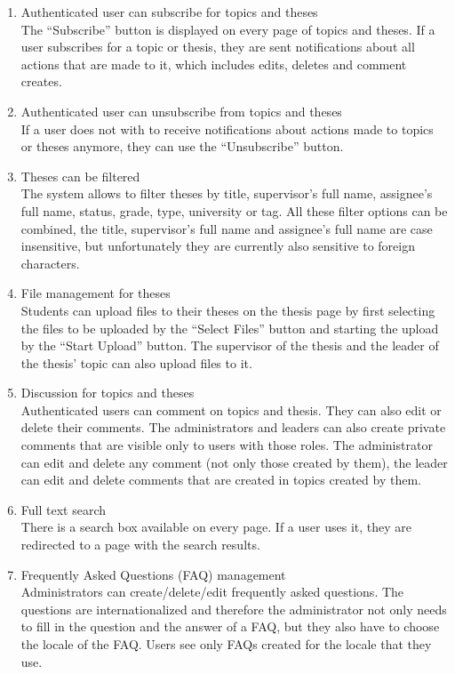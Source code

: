 \begin{enumerate}
    \item Authenticated user can subscribe for topics and theses\\
    The ``Subscribe'' button is displayed on every page of topics and theses. If a user subscribes for a topic or thesis, they are sent notifications about all actions that are made to it, which includes edits, deletes and comment creates.

    \item Authenticated user can unsubscribe from topics and theses\\
    If a user does not with to receive notifications about actions made to topics or theses anymore, they can use the ``Unsubscribe'' button.

    \item Theses can be filtered\\
    The system allows to filter theses by title, supervisor's full name, assignee's full name, status, grade, type, university or tag. All these filter options can be combined, the title, supervisor's full name and assignee's full name are case insensitive, but unfortunately they are currently also sensitive to foreign characters.

    \item File management for theses\\
    Students can upload files to their theses on the thesis page by first selecting the files to be uploaded by the ``Select Files'' button and starting the upload by the ``Start Upload'' button. The supervisor of the thesis and the leader of the thesis' topic can also upload files to it.

    \item Discussion for topics and theses\\
    Authenticated users can comment on topics and thesis. They can also edit or delete their comments. The administrators and leaders can also create private comments that are visible only to users with those roles. The administrator can edit and delete any comment (not only those created by them), the leader can edit and delete comments that are created in topics created by them.

    \item Full text search\\
    There is a search box available on every page. If a user uses it, they are redirected to a page with the search results. 

    \item Frequently Asked Questions (FAQ) management\\
    Administrators can create/delete/edit frequently asked questions. The questions are internationalized and therefore the administrator not only needs to fill in the question and the answer of a FAQ, but they also have to choose the locale of the FAQ. Users see only FAQs created for the locale that they use.

\end{enumerate}

